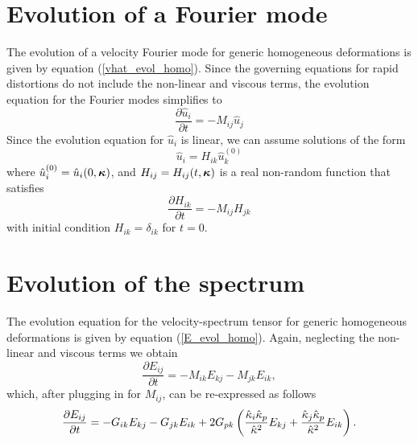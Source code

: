 \documentclass[oneside,a4paper,11pt]{report}
\begin{document}
\section{Evolution of a Fourier mode}

The evolution of a velocity Fourier mode for generic homogeneous deformations is given by equation (\ref{vhat_evol_homo}). Since the governing equations for rapid distortions do not include the non-linear and viscous terms, the evolution equation for the Fourier modes simplifies to
\begin{equation}
\frac{\partial \hat{u}_i}{\partial t} = -M_{ij} \hat{u}_j 
\end{equation}
Since the evolution equation for $\hat{u}_i$ is linear, we can assume solutions of the form
\begin{equation}
\hat{u}_i = H_{ik} \hat{u}_k^{(0)}
\end{equation}
where $\hat{u}_i^{(0)} = \hat{u}_i(0,\boldsymbol\kappa)$, and $H_{ij} = H_{ij}(t,\boldsymbol\kappa)$ is a real non-random function that satisfies
\begin{equation}
\frac{\partial H_{ik}}{\partial t} = - M_{ij} H_{jk}
\end{equation}
with initial condition $H_{ik} = \delta_{ik}$ for $t=0$.

\section{Evolution of the spectrum}

The evolution equation for the velocity-spectrum tensor for generic homogeneous deformations is given by equation (\ref{E_evol_homo}). Again, neglecting the non-linear and viscous terms we obtain
\begin{equation}
\frac{\partial E_{ij}}{\partial t} = -M_{ik} E_{kj} - M_{jk} E_{ik},
\end{equation}
which, after plugging in for $M_{ij}$, can be re-expressed as follows
\begin{equation}
\label{evol_phi}
\frac{\partial E_{ij}}{\partial t} = -G_{ik} E_{kj} - G_{jk}E_{ik} + 2 G_{pk} \left ( \frac{\hat{\kappa}_i \hat{\kappa}_p}{\hat{\kappa}^2} E_{kj} + \frac{\hat{\kappa}_j \hat{\kappa}_p}{\hat{\kappa}^2} E_{ik} \right ).
\end{equation}
\end{document}
